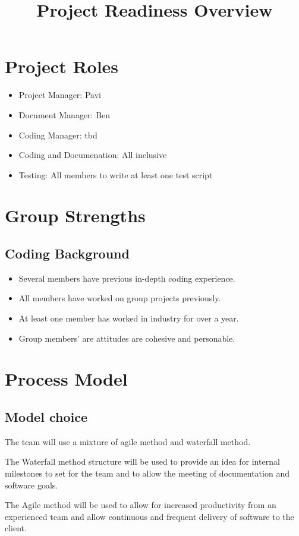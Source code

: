 \documentclass[11pt, letterpaper]{article}
\title{Project Readiness Overview}
\begin{document}
\maketitle

\section{Project Roles}

\begin{itemize}
\item Project Manager: Pavi
\item Document Manager: Ben 
\item Coding Manager: tbd
\item Coding and Documenation: All inclusive
\item Testing: All members to write at least one test script
\end{itemize}


\section{Group Strengths}
\subsection{Coding Background}
\begin{itemize}
\item Several members have previous in-depth coding experience.
\item All members have worked on group projects previously.
\item At least one member has worked in industry for over a year.
\item Group members' are attitudes are cohesive and personable.
\end{itemize}

\section{Process Model}
\subsection{Model choice}
The team will use a mixture of agile method and waterfall method.\par
The Waterfall method structure will be used to provide an idea for internal milestones to set for the team and 
to allow the meeting of documentation and software goals.\par
The Agile method will be used to allow for increased productivity from an experienced team 
and allow continuous and frequent delivery of software to the client.
\end{document}
